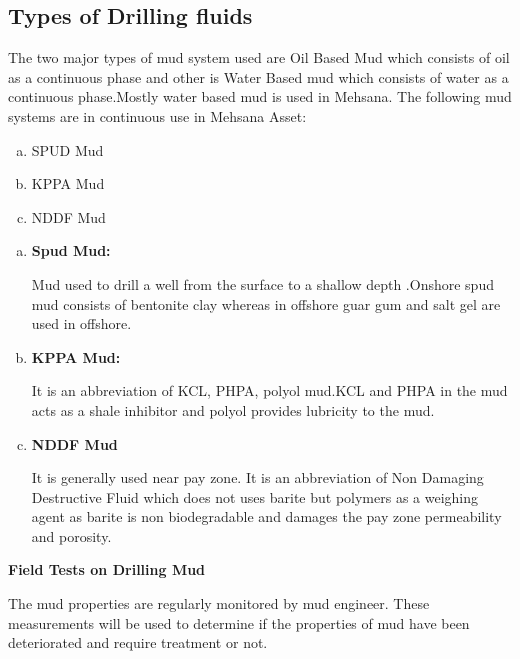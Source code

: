 \subsection*{Types of Drilling fluids}

The two major types of mud system used are Oil Based Mud which consists of oil 
as a continuous phase and other is Water Based mud which consists of water as 
a continuous phase.Mostly water based mud is used in Mehsana. The following 
mud systems are in continuous use in Mehsana Asset:

\begin{enumerate}[(a)]

\item SPUD Mud
\item KPPA Mud
\item NDDF Mud

\end{enumerate}

\begin{enumerate}[(a)]

\item \textbf{Spud Mud:}

Mud used to drill a well from the surface to a shallow depth .Onshore spud mud
consists of bentonite clay whereas in offshore guar gum and salt gel are used 
in offshore.

\item \textbf{KPPA Mud:}

It is an abbreviation of KCL, PHPA, polyol mud.KCL and PHPA in the mud acts as 
a shale inhibitor and polyol provides lubricity to the mud.

\item \textbf{NDDF Mud}

It is generally used near pay zone. It is an abbreviation of Non Damaging 
Destructive Fluid which does not uses barite but polymers as a weighing agent as 
barite is non biodegradable and damages the pay zone permeability and porosity.
\end{enumerate}


\noindent \textbf{Field Tests on Drilling Mud}

The mud properties are regularly monitored by mud engineer. These measurements 
will be used to determine if the properties of mud have been deteriorated and 
require treatment or not.

